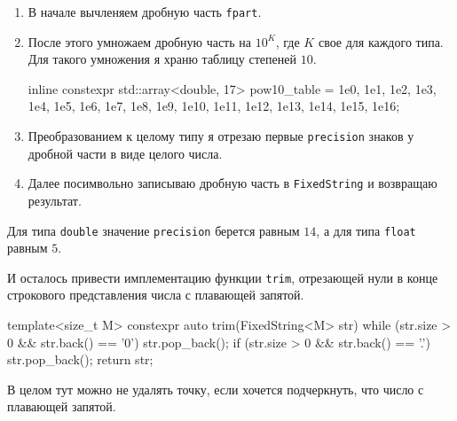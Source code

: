 \begin{enumerate}
\item В начале вычленяем дробную часть \verb"fpart".

\item После этого умножаем дробную часть на $10^K$, где $K$ свое для каждого типа.
Для такого умножения я храню таблицу степеней $10$.
\begin{cppcode}[numbers = none]
inline constexpr std::array<double, 17> pow10_table = {
    1e0, 1e1,  1e2,  1e3,  1e4,  1e5,  1e6,  1e7, 1e8,
    1e9, 1e10, 1e11, 1e12, 1e13, 1e14, 1e15, 1e16};
\end{cppcode}

\item Преобразованием к целому типу я отрезаю первые \verb"precision" знаков у дробной части в виде целого числа.

\item Далее посимвольно записываю дробную часть в \verb"FixedString" и возвращаю результат.
\end{enumerate}
Для типа \verb"double" значение \verb"precision" берется равным $14$, а для типа \verb"float" равным $5$.

И осталось привести имплементацию функции \verb"trim", отрезающей нули в конце строкового представления числа с плавающей запятой.
\begin{cppcode}
template<size_t M>
constexpr auto trim(FixedString<M> str) {
  while (str.size > 0 && str.back() == '0')
    str.pop_back();
  if (str.size > 0 && str.back() == '.')
    str.pop_back();
  return str;
}
\end{cppcode}
В целом тут можно не удалять точку, если хочется подчеркнуть, что число с плавающей запятой.
